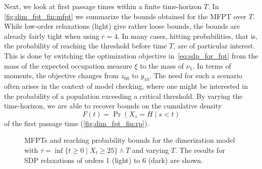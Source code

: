 Next, we look at first passage times within a finite time-horizon $T$.
In \autoref{fig:dim_fpt_fin:mfpt} we summarize the bounds obtained
for the \ac{MFPT} over $T$.
While low-order relaxations (light) give rather loose bounds, the
bounds are already fairly tight
when using $r=4$.
In many cases, hitting probabilities, that is, the probability of reaching the
threshold before time $T$, are of particular interest.
This is done by switching the optimization objective
in~\eqref{eq:sdp_for_fpt} from the mass of the
expected occupation measure $\xi$ to the mass of $\nu_1$.
In terms of moments, the objective changes from $z_{00}$ to $y_{10}$.
The need for such a scenario often aris\-es in the context of model
checking, where one might be
interested in the probability of a population exceeding a critical threshold.
By varying the time-horizon, we are able to recover bounds on the
cumulative density
\[
  F(t) = \Pr(X_s=H\mid s<t)
\]
of the first passage time (\autoref{fig:dim_fpt_fin:rp}).
\begin{figure}
  \centering
  \caption[\acp{MFPT} up to a varying time-horizon]{\Acp{MFPT} and
    reaching probability bounds for the dimerization model with
    $\tau=\inf\{t\geq 0\mid X_t \geq 25\}\land T$ and varying $T$.
    The results for \ac{SDP} relaxations of orders \num{1} (light) to
  \num{6} (dark) are shown.\label{fig:dim_fpt_fin}}
\end{figure}
